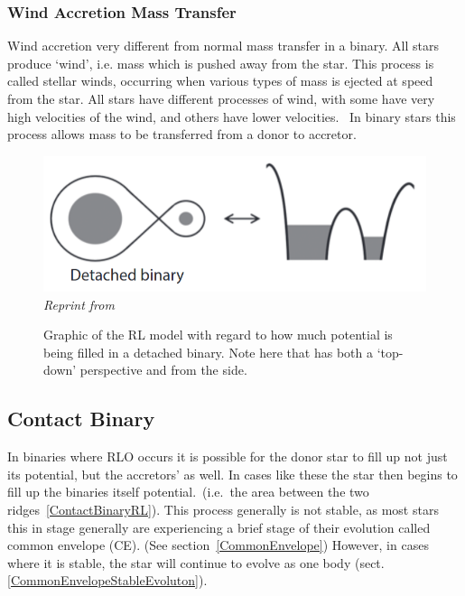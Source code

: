 \documentclass[12pt, a4paper]{article}
\begin{document}
        \subsubsection{Wind Accretion Mass Transfer} \label{WindAccretion}
        Wind accretion very different from normal mass transfer in a binary. All stars produce `wind', i.e. mass which is pushed away from the star. This process is called stellar winds, occurring when various types of mass is ejected at speed from the star. All stars have different processes of wind, with some have very high velocities of the wind, and others have lower velocities.~\cite{Lamers_1999} In binary stars this process allows mass to be transferred from a donor to accretor.
        
        
        \begin{figure}[H]
            \centering
            \includegraphics[scale = .4]{Figs/Detached binary.png}\\
            \textit{Reprint from~\cite{TaurisvandenHeuvel+2023}}
            \caption{Graphic of the RL model with regard to how much potential is being filled in a detached binary. Note here that has both a `top-down' perspective and from the side.}
            \label{DetachedBinaryRL}
        \end{figure}
        

        \subsection{\centering Contact Binary}
        In binaries where RLO occurs it is possible for the donor star to fill up not just its potential, but the accretors' as well. In cases like these the star then begins to fill up the binaries itself potential.\ (i.e.\ the area between the two ridges~\ref{ContactBinaryRL}). This process generally is not stable, as most stars this in stage generally are experiencing a brief stage of their evolution called common envelope (CE). (See section~\ref{CommonEnvelope}) However, in cases where it is stable, the star will continue to evolve as one body (sect. \ref{CommonEnvelopeStableEvoluton}).
\end{document}
